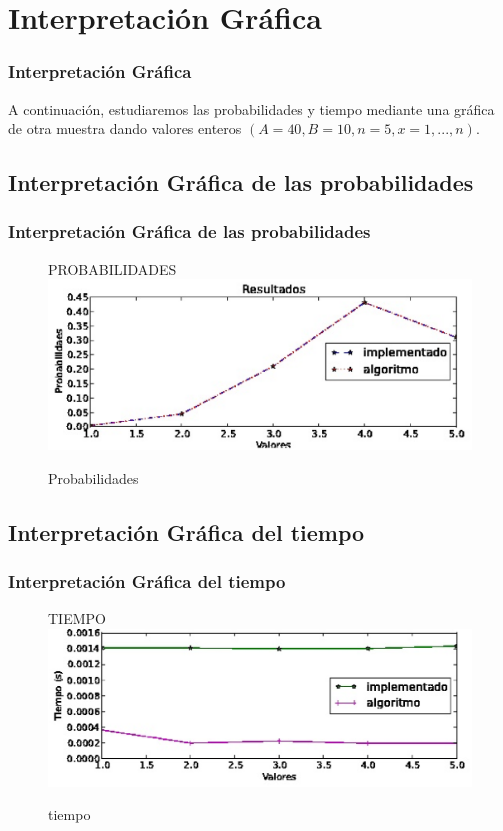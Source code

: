 \documentclass[10pt]{beamer}
\begin{document}

\section{Interpretación Gráfica}
\begin{frame}
\frametitle{Interpretación Gráfica}

A continuación, estudiaremos las probabilidades y tiempo mediante una gráfica de otra muestra dando valores enteros $(A=40, B=10, n=5 ,x=1,...,n).$

\end{frame}


\subsection{Interpretación Gráfica de las probabilidades}
\begin{frame}
\frametitle{Interpretación Gráfica de las probabilidades}
\begin{figure}[!ht]{PROBABILIDADES\\}
\centering
\includegraphics[width=1.1\textwidth]{grafica1.eps}
\caption{Probabilidades}
\end{figure}
\end{frame}


\subsection{Interpretación Gráfica del tiempo}
\begin{frame}
\frametitle{Interpretación Gráfica del tiempo}


\begin{figure}[!ht]{TIEMPO\\}
\centering
\includegraphics[width=1.1\textwidth]{grafica2.eps}
\caption{tiempo}
\end{figure}

\end{frame}
\end{document}

